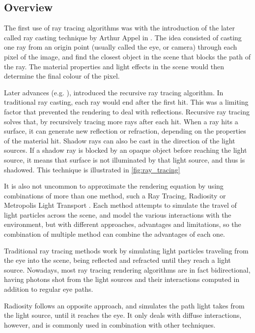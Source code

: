 \documentclass[main.tex]{subfiles}
\begin{document}
\subsection{Overview}

The first use of ray tracing algorithms was with the introduction of the later called ray casting technique by Arthur Appel in \cite{appel1968some}. The idea consisted of casting one ray from an origin point (usually called the eye, or camera) through each pixel of the image, and find the closest object in the scene that blocks the path of the ray. The material properties and light effects in the scene would then determine the final colour of the pixel.

Later advances (e.g. \cite{whitted2005improved}), introduced the recursive ray tracing algorithm. In traditional ray casting, each ray would end after the first hit. This was a limiting factor that prevented the rendering to deal with reflections. Recursive ray tracing solves that, by recursively tracing more rays after each hit. When a ray hits a surface, it can generate new reflection or refraction, depending on the properties of the material hit. Shadow rays can also be cast in the direction of the light sources. If a shadow ray is blocked by an opaque object before reaching the light source, it means that surface is not illuminated by that light source, and thus is shadowed. This technique is illustrated in \cref{fig:ray_tracing}


It is also not uncommon to approximate the rendering equation by using combinations of more than one method, such a Ray Tracing, Radiosity or Metropolis Light Transport \cite{wallace1987two,veach1997metropolis}. Each method attempts to simulate the travel of light particles across the scene, and model the various interactions with the environment, but with different approaches, advantages and limitations, so the combination of multiple method can combine the advantages of each one.

Traditional ray tracing methods work by simulating light particles traveling from the eye into the scene, being reflected and refracted until they reach a light source. Nowadays, most ray tracing rendering algorithms are in fact bidirectional, having photons shot from the light sources and their interactions computed in addition to regular eye paths.

Radiosity follows an opposite approach, and simulates the path light takes from the light source, until it reaches the eye. It only deals with diffuse interactions, however, and is commonly used in combination with other techniques.
\end{document}
